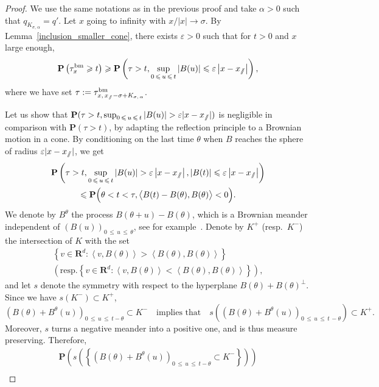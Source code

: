 \documentclass[AHL,Unicode,longabstracts,published]{cedram}
\DeclareMathOperator{\bm}{bm}
\newcommand{\pr}{\mathbf{P}}
\newcommand{\bfR}{\mathbf{R}}
\renewcommand{\epsilon}{\varepsilon}
\renewcommand{\leq}{\leqslant}
\renewcommand{\geq}{\geqslant}
\newcommand{\sslash}{\slash\mkern-6.4mu\slash}
\begin{document}
\begin{proof}
We use the same notations as in the previous proof and take $\alpha>0$ such that $q_{K_{\sigma,\,\alpha}}=q'$. Let $x$ going to infinity with $x/| x|\rightarrow \sigma$. By Lemma~\ref{inclusion_smaller_cone}, there exists $\epsilon>0$ such that for $t>0$ and $x$ large enough,
\[
\pr\left(\tau_{x}^{\bm}\geq t\right)\geq \pr\left(\tau>t, \sup_{0\,\leq\,u\,\leq\,t}\left|B(u)\right|\leq \epsilon \left|x-x_{\sslash}\right|\right),
\]
where we have set $\tau:=\tau_{x,\,x_{\sslash}-\sigma+K_{\sigma,\,\alpha}}^{\bm}$.

Let us show that $\pr(\tau>t, \sup_{0\,\leq\,u\,\leq\,t}| B(u)|> \epsilon | x-x_{\sslash}|)$ is negligible in comparison with $\pr(\tau>t)$, by adapting the reflection principle to a Brownian motion in a cone. By conditioning on the last time $\theta$ when $B$ reaches the sphere of radius $\epsilon| x -x_{\sslash}|$, we get
\begin{multline*}
\pr\left(\tau>t, \sup_{0\,\leq\,u\,\leq\,t}|B(u)|> \epsilon \left|x-x_{\sslash}\right|, |B(t)|\leq \epsilon \left|x-x_{\sslash}\right|\right) \\
\leq \pr\Big(\theta<t<\tau, \big\langle B(t)-B(\theta),B(\theta)\big\rangle<0\Big).
\end{multline*}
We denote by $B^{\theta}$ the process $B(\theta+u)-B(\theta)$, which is a Brownian meander independent of $(B(u))_{0\,\leq\,u\,\leq\,\theta}$, see for example~\cite{ReYo-13}. Denote by $K^{+}$ (resp.\ $K^{-}$) the intersection of $K$ with the set
\begin{multline*}
\left\{v\in \bfR^{d}:\left\langle v,B(\theta)\right\rangle >\left\langle B(\theta),B(\theta)\right\rangle\right\}\\
\left(\text{resp.} 
\left\{ v\in \bfR^{d}:\left\langle v,B(\theta)\right\rangle <\left\langle B(\theta),B(\theta)\right\rangle\right\}\right),
\end{multline*}
and let $s$ denote the symmetry with respect to the hyperplane $B(\theta)+B(\theta)^{\perp}$. Since we have $s(K^{-})\subset K^{+}$,
\[
\left(B(\theta)+B^{\theta}(u)\right)_{0\,\leq\,u\,\leq\,t-\theta}\subset K^{-}\quad \text{implies that}\quad s\left(\left(B(\theta)+B^{\theta}(u)\right)_{0\,\leq\,u\,\leq\,t\,-\theta}\right)\subset K^{+}.
\]
Moreover, $s$ turns a negative meander into a positive one, and is thus measure preserving. Therefore,
\begin{multline*}
\pr\left(s\left(\left\{ \left(B(\theta)+B^{\theta}(u)\right)_{0\,\leq\,u\,\leq\,t-\theta}\subset K^{-}\right\}\right)\right)\\

\end{multline*}
\end{proof}
\end{document}
